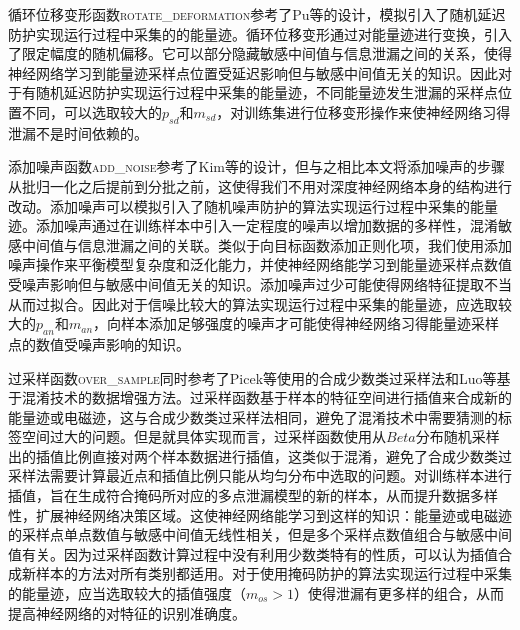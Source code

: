 {	循环位移变形函数\textsc{rotate\_deformation}参考了Pu等\citep{Pu17}的设计，模拟引入了随机延迟防护实现运行过程中采集的的能量迹。循环位移变形通过对能量迹进行变换，引入了限定幅度的随机偏移。它可以部分隐藏敏感中间值与信息泄漏之间的关系，使得神经网络学习到能量迹采样点位置受延迟影响但与敏感中间值无关的知识。因此对于有随机延迟防护实现运行过程中采集的能量迹，不同能量迹发生泄漏的采样点位置不同，可以选取较大的$p_{sd}$和$m_{sd}$，对训练集进行位移变形操作来使神经网络习得泄漏不是时间依赖的。
	
	添加噪声函数\textsc{add\_noise}参考了Kim等\citep{Kim19}的设计，但与之相比本文将添加噪声的步骤从批归一化之后提前到分批之前，这使得我们不用对深度神经网络本身的结构进行改动。添加噪声可以模拟引入了随机噪声防护的算法实现运行过程中采集的能量迹。添加噪声通过在训练样本中引入一定程度的噪声以增加数据的多样性，混淆敏感中间值与信息泄漏之间的关联。类似于向目标函数添加正则化项，我们使用添加噪声操作来平衡模型复杂度和泛化能力，并使神经网络能学习到能量迹采样点数值受噪声影响但与敏感中间值无关的知识。添加噪声过少可能使得网络特征提取不当从而过拟合。因此对于信噪比较大的算法实现运行过程中采集的能量迹，应选取较大的$p_{an}$和$m_{an}$，向样本添加足够强度的噪声才可能使得神经网络习得能量迹采样点的数值受噪声影响的知识。
	
	过采样函数\textsc{over\_sample}同时参考了Picek等\citep{Picek19}使用的合成少数类过采样法和Luo等\citep{Luo21}基于混淆技术的数据增强方法。过采样函数基于样本的特征空间进行插值来合成新的能量迹或电磁迹，这与合成少数类过采样法相同，避免了混淆技术中需要猜测的标签空间过大的问题。但是就具体实现而言，过采样函数使用从$Beta$分布随机采样出的插值比例直接对两个样本数据进行插值，这类似于混淆，避免了合成少数类过采样法需要计算最近点和插值比例只能从均匀分布中选取的问题。对训练样本进行插值，旨在生成符合掩码所对应的多点泄漏模型的新的样本，从而提升数据多样性，扩展神经网络决策区域。这使神经网络能学习到这样的知识：能量迹或电磁迹的采样点单点数值与敏感中间值无线性相关，但是多个采样点数值组合与敏感中间值有关。因为过采样函数计算过程中没有利用少数类特有的性质，可以认为插值合成新样本的方法对所有类别都适用。对于使用掩码防护的算法实现运行过程中采集的能量迹，应当选取较大的插值强度（$m_{os}>1$）使得泄漏有更多样的组合，从而提高神经网络的对特征的识别准确度。
	
}
